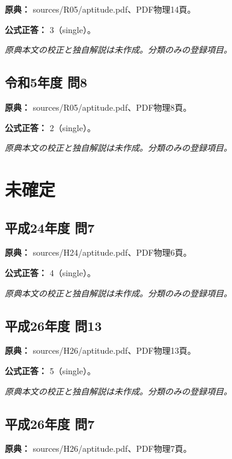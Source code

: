\noindent\textbf{原典：} sources/R05/aptitude.pdf、PDF物理14頁。

\textbf{公式正答：} 3（single）。

\par\textit{原典本文の校正と独自解説は未作成。分類のみの登録項目。}

\subsection{令和5年度 問8}
\label{q:r05-reg-apt-08}

\noindent\textbf{原典：} sources/R05/aptitude.pdf、PDF物理8頁。

\textbf{公式正答：} 2（single）。

\par\textit{原典本文の校正と独自解説は未作成。分類のみの登録項目。}

\section{未確定}

\subsection{平成24年度 問7}
\label{q:h24-reg-apt-07}

\noindent\textbf{原典：} sources/H24/aptitude.pdf、PDF物理6頁。

\textbf{公式正答：} 4（single）。

\par\textit{原典本文の校正と独自解説は未作成。分類のみの登録項目。}

\subsection{平成26年度 問13}
\label{q:h26-reg-apt-13}

\noindent\textbf{原典：} sources/H26/aptitude.pdf、PDF物理13頁。

\textbf{公式正答：} 5（single）。

\par\textit{原典本文の校正と独自解説は未作成。分類のみの登録項目。}

\subsection{平成26年度 問7}
\label{q:h26-reg-apt-07}

\noindent\textbf{原典：} sources/H26/aptitude.pdf、PDF物理7頁。

